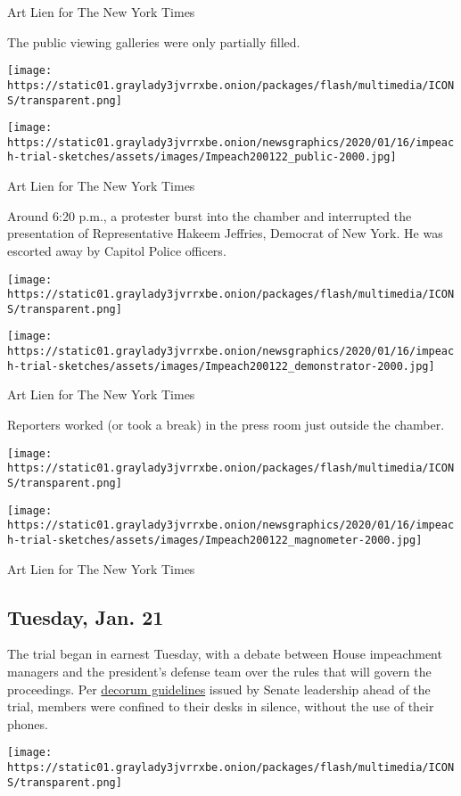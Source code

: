 Art Lien for The New York Times

The public viewing galleries were only partially filled.

\texttt{[image: https://static01.graylady3jvrrxbe.onion/packages/flash/multimedia/ICONS/transparent.png]}

\texttt{[image: https://static01.graylady3jvrrxbe.onion/newsgraphics/2020/01/16/impeach-trial-sketches/assets/images/Impeach200122\_public-2000.jpg]}

Art Lien for The New York Times

Around 6:20 p.m., a protester burst into the chamber and interrupted the
presentation of Representative Hakeem Jeffries, Democrat of New York. He
was escorted away by Capitol Police officers.

\texttt{[image: https://static01.graylady3jvrrxbe.onion/packages/flash/multimedia/ICONS/transparent.png]}

\texttt{[image: https://static01.graylady3jvrrxbe.onion/newsgraphics/2020/01/16/impeach-trial-sketches/assets/images/Impeach200122\_demonstrator-2000.jpg]}

Art Lien for The New York Times

Reporters worked (or took a break) in the press room just outside the
chamber.

\texttt{[image: https://static01.graylady3jvrrxbe.onion/packages/flash/multimedia/ICONS/transparent.png]}

\texttt{[image: https://static01.graylady3jvrrxbe.onion/newsgraphics/2020/01/16/impeach-trial-sketches/assets/images/Impeach200122\_magnometer-2000.jpg]}

Art Lien for The New York Times

\hypertarget{tuesday-jan-21}{%
\subsection{Tuesday, Jan. 21}\label{tuesday-jan-21}}

The trial began in earnest Tuesday, with a debate between House
impeachment managers and the president's defense team over the rules
that will govern the proceedings. Per
\href{https://www.nytimes3xbfgragh.onion/2020/01/21/us/politics/senate-impeachment.html}{decorum
guidelines} issued by Senate leadership ahead of the trial, members were
confined to their desks in silence, without the use of their phones.

\texttt{[image: https://static01.graylady3jvrrxbe.onion/packages/flash/multimedia/ICONS/transparent.png]}

